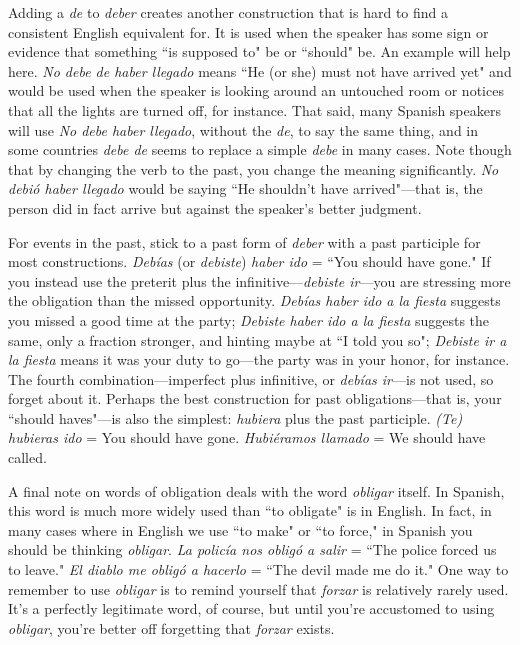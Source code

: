 Adding a \emph{de} to \emph{deber} creates another construction that is
hard to find a consistent English equivalent for. It is used when the
speaker has some sign or evidence that something ``is supposed to"
be or ``should" be. An example will help here. \emph{No debe de haber llegado} means ``He (or she) must not have arrived yet" and would be used
when the speaker is looking around an untouched room or notices that
all the lights are turned off, for instance. That said, many Spanish speakers will use \emph{No debe haber llegado}, without the \emph{de}, to say the
same thing, and in some countries \emph{debe de} seems to replace a simple
\emph{debe} in many cases. Note though that by changing the verb to the
past, you change the meaning significantly. \emph{No debió haber llegado}
would be saying ``He shouldn't have arrived"---that is, the person did
in fact arrive but against the speaker's better judgment.

For events in the past, stick to a past form of \emph{deber} with a past
participle for most constructions. \emph{Debías} (or \emph{debiste}) \emph{haber ido} =
``You should have gone." If you instead use the preterit plus the infinitive---\emph{debiste ir}---you are stressing more the obligation than the
missed opportunity. \emph{Debías haber ido a la fiesta} suggests you missed a
good time at the party; \emph{Debiste haber ido a la fiesta} suggests the same,
only a fraction stronger, and hinting maybe at ``I told you so"; \emph{Debiste
	ir a la fiesta} means it was your duty to go---the party was in your
honor, for instance. The fourth combination---imperfect plus infinitive, or \emph{debías ir}---is not used, so forget about it. Perhaps the best construction for past obligations---that is, your ``should haves"---is also
the simplest: \emph{hubiera} plus the past participle. \emph{(Te) hubieras ido} = You
should have gone. \emph{Hubiéramos llamado} = We should have called.

A final note on words of obligation deals with the word \emph{obligar} itself. In Spanish, this word is much more widely used than ``to
obligate" is in English. In fact, in many cases where in English we use
``to make" or ``to force," in Spanish you should be thinking \emph{obligar}. \emph{La
	policía nos obligó a salir} = ``The police forced us to leave." \emph{El diablo
	me obligó a hacerlo} = ``The devil made me do it." One way to remember to use \emph{obligar} is to remind yourself that \emph{forzar} is relatively rarely
used. It's a perfectly legitimate word, of course, but until you're accustomed to using \emph{obligar}, you're better off forgetting that \emph{forzar} exists.

